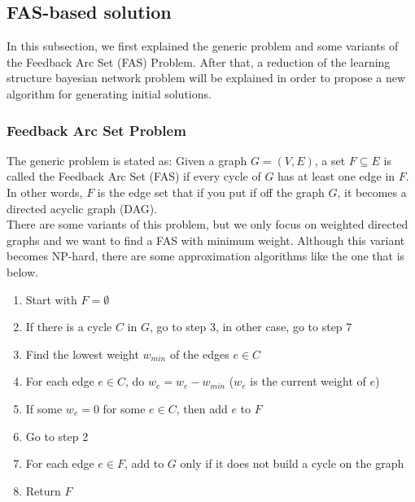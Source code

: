 \subsection{FAS-based solution}
\label{subsec:fasapproach}

In this subsection, we first explained the generic problem and some variants of the Feedback Arc Set (FAS) Problem. After that, a reduction of the learning structure bayesian network problem will be explained in order to propose a new algorithm for generating initial solutions.

\subsubsection{Feedback Arc Set Problem}
\label{subsub:fasp}

The generic problem is stated as: Given a graph $G = ( V , E )$, a set $F \subseteq E$ is called the Feedback Arc Set (FAS) if every cycle of $G$ has at least one edge in $F$. In other words, $F$ is the edge set that if you put if off the graph $G$, it becomes a directed acyclic graph (DAG).\\
There are some variants of this problem, but we only focus on weighted directed graphs and we want to find a FAS with minimum weight. Although this variant becomes NP-hard, there are some approximation algorithms like the one that is below.
\begin{enumerate}
	\item Start with $F = \emptyset$
	\item If there is a cycle $C$ in $G$, go to step 3, in other case, go to step 7
	\item Find the lowest weight $w_{min}$ of the edges $e \in C$
	\item For each edge $e \in C$, do $w_e = w_e - w_{min}$ ($w_e$ is the current weight of $e$)
	\item If some $w_e = 0$ for some $e \in C$, then add $e$ to $F$
	\item Go to step 2
	\item For each edge $e \in F$, add to $G$ only if it does not build a cycle on the graph
	\item Return $F$
\end{enumerate}

